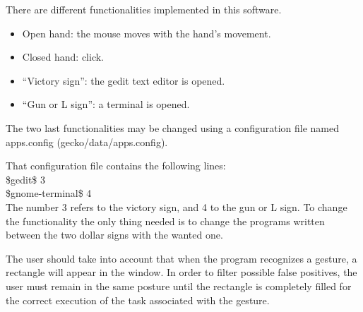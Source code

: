 There are different functionalities implemented in this software. 
\begin{itemize}
\item Open hand: the mouse moves with the hand's movement.
\item Closed hand: click.
\item ``Victory sign'': the gedit text editor is opened.
\item ``Gun or L sign'': a terminal is opened. 
\end{itemize}

The two last functionalities may be changed using a configuration file named apps.config (gecko/data/apps.config). 

That configuration file contains the following lines:
\\[0.5cm]
\$gedit\$ 3 \\
\$gnome-terminal\$ 4
\\[0.5cm]

The number 3 refers to the victory sign, and  4 to the gun or L sign. To change the functionality the only thing needed is to change the programs written between the two dollar signs with the wanted one. 

The user should take into account that when the program recognizes a gesture, a rectangle will appear in the window. In order to filter possible false positives, the user must remain in the same posture until the rectangle is completely filled for the correct execution of the task associated with the gesture. 


\newpage
